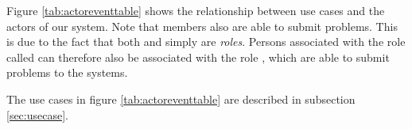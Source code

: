 



Figure \ref{tab:actoreventtable} shows the relationship between use cases and the actors of our system. Note that \astaff{} members also are able to submit problems. This is due to the fact that both \aclient{} and \astaff{} simply are \textit{roles}. Persons associated with the role called \astaff{} can therefore also be associated with the role \aclient{}, which are able to submit problems to the systems.

The use cases in figure \ref{tab:actoreventtable} are described in subsection \ref{sec:usecase}.



